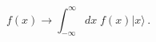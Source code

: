 \begin{equation}
f (x) \rightarrow \int_{-\infty}^\infty dx \;f (x) | x \rangle \,.
\label{eq:function-state}
\end{equation}


